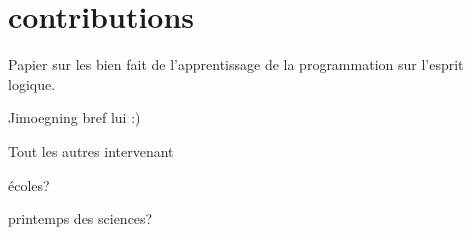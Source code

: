 \section{contributions}
Papier sur les bien fait de l'apprentissage de la programmation sur l'esprit logique.

Jimoegning bref lui :)

Tout les autres intervenant

écoles?

printemps des sciences?
